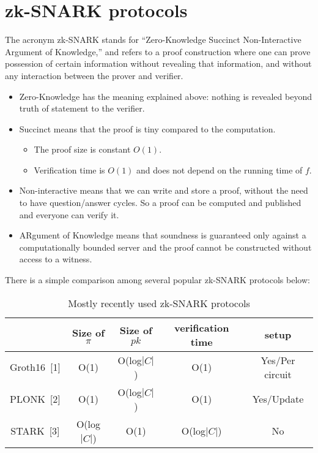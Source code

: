 \documentclass{article}
\renewcommand{\cite}[1]{[#1]}
\begin{document}
\section{zk-SNARK protocols}
The acronym zk-SNARK stands for “Zero-Knowledge Succinct Non-Interactive Argument of Knowledge,” and refers to a proof construction where one can prove possession of certain information without revealing that information, and without any interaction between the prover and verifier.

\begin{itemize}
    \item Zero-Knowledge has the meaning explained above: nothing is revealed beyond truth of statement to the verifier.
    \item Succinct means that the proof is tiny compared to the computation.
    \begin{itemize}
        \item The proof size is constant $O(1)$.
        \item Verification time is $O(1)$ and does not depend on the running time of $f$.
    \end{itemize}
    \item Non-interactive means that we can write and store a proof, without the need to have question/answer cycles. So a proof can be computed and published and everyone can verify it.
    \item ARgument of Knowledge means that soundness is guaranteed only against a computationally bounded server and the proof cannot be constructed without access to a witness.
\end{itemize}


There is a simple comparison among several popular zk-SNARK protocols below:
\begin{table}[ht]
\centering
\begin{tabular}{|c|c|c|c|c|}
        \hline
        & Size of $\pi$ & Size of $pk$ & verification time & setup           \\ 
        \hline
Groth16~\cite{1} & O(1)                       & O(log$|C|$)  & O(1)              & Yes/Per circuit \\
        \hline
PLONK~\cite{2}   & O(1)                       & O(log$|C|$)  & O(1)              & Yes/Update      \\
        \hline
STARK~\cite{3}   & O(log$|C|$)                  & O(1)       & O(log$|C|$)         & No       \\      
        \hline

\end{tabular}
\caption{Mostly recently used zk-SNARK protocols} 

\end{table}
\end{document}
